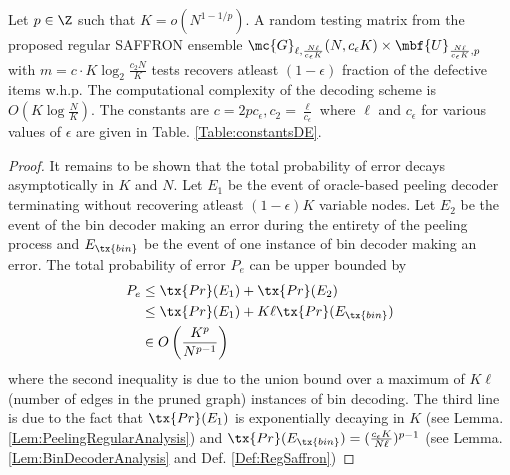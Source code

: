 \documentclass[conference,twocolumn]{IEEEtran}
\def\ceps{c_{\epsilon}}
\def\proofgap{-3ex}
\begin{document}
\begin{theorem}
\label{Thm:NoiselessMain}
Let $p\in\Z$ such that $K=o(N^{1-1/p})$. A random testing matrix from the proposed regular SAFFRON ensemble $\mc{G}_{\ell,\frac{N\ell}{\ceps K}}(N,\ceps K)\times \mbf{U}_{\frac{N\ell}{\ceps K},p}$ with $m=c\cdot K\log_{2}\frac{c_2 N}{K}$ tests recovers atleast $(1-\epsilon)$ fraction of the defective items w.h.p. The computational complexity of the decoding scheme is $O(K\log \frac{N}{K})$. The constants are $c=2p\ceps, c_2=\frac{\ell}{\ceps}$ where $\ell$ and $\ceps$ for various values of $\epsilon$ are given in Table. \ref{Table:constantsDE}.%
\end{theorem}
\vspace{\proofgap}
\begin{proof}
It remains to be shown that the total probability of error decays asymptotically in $K$ and $N$. Let $E_1$ be the event of oracle-based peeling decoder terminating without recovering atleast $(1-\epsilon)K$ variable nodes. Let $E_2$ be the event of the bin decoder making an error during the entirety of the peeling process and $E_{\tx{bin}}$ be the event of one instance of bin decoder making an error. The total probability of error $P_e$ can be upper bounded by 
\begin{align*}
P_e &\leq \tx{Pr}(E_1)+ \tx{Pr}(E_2)\\
               &\leq \tx{Pr}(E_1)+ K\ell\tx{ Pr}(E_{\tx{bin}})\\
               &\in O\left(\frac{K^{p}}{N^{p-1}}\right)
\end{align*}
where the second inequality is due to the union bound over a maximum of $K\ell$ (number of edges in the pruned graph) instances of bin decoding. The third line is due to the fact that $\tx{Pr}(E_1)$ is exponentially decaying in $K$ (see Lemma. \ref{Lem:PeelingRegularAnalysis}) and $\tx{Pr}(E_{\tx{bin}})=(\frac{\ceps K}{N\ell})^{p-1}$ (see Lemma. \ref{Lem:BinDecoderAnalysis} and Def. \ref{Def:RegSaffron})
\end{proof}
\end{document}
